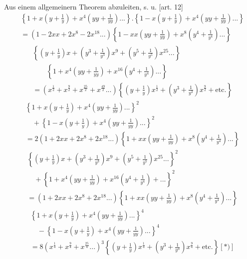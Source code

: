 \begingroup
\makeatletter\tagsleft@true\let\veqno\@@leqno\makeatother
\newcommand{\TransCrescent}{\tikz[baseline=-.1em,x=.09em,y=.09em]{\draw[line width=.4pt] (5,0) .. controls (-1,0) and (-1,8) .. (5,8) .. controls (0,7.5) and (0,.5) .. (5,0);}}
\par\indent Aus einem allgemeinern Theorem abzuleiten, s. u. [art. 12]
\[\begin{aligned}
&\left\{1+x\left(y+\frac1y\right)+x^4\left(yy+\frac1{yy}\right){.}{.}{.}\right\}.
\left\{1-x\left(y+\frac1y\right)+x^4\left(yy+\frac1{yy}\right){.}{.}{.}\right\}\\
&=(1-2xx+2x^8-2x^{18}{.}{.}{.})\left\{1-xx\left(yy+\frac1{yy}\right)+x^8\left(y^4+\frac1{y^4}\right){.}{.}{.}\right\}
\end{aligned}\]
\[\begin{aligned}
&\left\{\left(y+\frac1y\right)x+\left(y^3+\frac1{y^3}\right)x^9+\left(y^5+\frac1{y^5}\right)x^{25}{.}{.}{.}\right\}\\
&\qquad\left\{1+x^4\left(yy+\frac1{yy}\right)+x^{16}\left(y^4+\frac1{y^4}\right){.}{.}{.}\right\}\\
&=(x^{\frac12}+x^{\frac92}+x^{\frac{25}2}+x^{\frac{49}2}{.}{.}{.})\left\{\left(y+\frac1y\right)x^{\frac12}+\left(y^3+\frac1{y^3}\right)x^{\frac92}+\text{etc.}\right\}
\end{aligned}\]
\[\begin{aligned}
&\left\{1+x\left(y+\frac1y\right)+x^4\left(yy+\frac1{yy}\right){.}{.}{.}\right\}^2\\
&\quad+\left\{1-x\left(y+\frac1y\right)+x^4\left(yy+\frac1{yy}\right){.}{.}{.}\right\}^2\\
&=2(1+2xx+2x^8+2x^{18}{.}{.}{.})\left\{1+xx\left(yy+\frac1{yy}\right)+x^8\left(y^4+\frac1{y^4}\right){.}{.}{.}\right\}
\end{aligned}\]
\clearpage
{}
\[\begin{aligned}
&\left\{\left(y+\frac1y\right)x+\left(y^3+\frac1{y^3}\right)x^9+\left(y^5+\frac1{y^5}\right)x^{25}{.}{.}{.}\right\}^2\\
&\quad+\left\{1+x^4\left(yy+\frac1{yy}\right)+x^{16}\left(y^4+\frac1{y^4}\right)+{.}{.}{.}\right\}^2\\
&=(1+2xx+2x^8+2x^{18}{.}{.}{.})\left\{1+xx\left(yy+\frac1{yy}\right)+x^8\left(y^4+\frac1{y^4}\right){.}{.}{.}\right\}
\end{aligned}\]
\[\begin{aligned}
&\left\{1+x\left(y+\frac1y\right)+x^4\left(yy+\frac1{yy}\right){.}{.}{.}\right\}^4\\
&\quad-\left\{1-x\left(y+\frac1y\right)+x^4\left(yy+\frac1{yy}\right){.}{.}{.}\right\}^4\\
&=8(x^{\frac14}+x^{\frac94}+x^{\frac{25}4}{.}{.}{.})^3\left\{\left(y+\frac1y\right)x^{\frac14}+\left(y^3+\frac1{y^3}\right)x^{\frac94}+\text{etc.}\right\}[\text{*)}]
\end{aligned}\]
